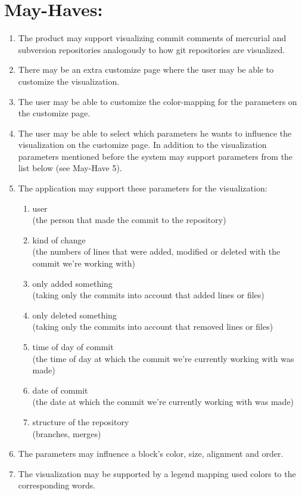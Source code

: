 \documentclass[12pt]{scrartcl}
\begin{document}
\section{May-Haves:}
\begin{enumerate}
\item The product may support visualizing commit comments of mercurial and
	subversion repositories analogously to how git repositories are
	visualized.
\item There may be an extra customize page where the user may be able to customize the visualization.
\item The user may be able to customize the color-mapping for the parameters on the customize page.
\item The user may be able to select which parameters he wants to influence the visualization on the customize page. In addition to the visualization parameters mentioned before the system may support parameters from the list below (see May-Have 5).
\item The application may support these parameters for the visualization:
\begin{enumerate}
\item user\\
(the person that made the commit to the repository)
\item kind of change\\  
(the numbers of lines that were added, modified or deleted with the commit we're working with)
\item only added something \\
(taking only the commits into account that added lines or files)
\item only deleted something\\
(taking only the commits into account that removed lines or files)
\item time of day of commit\\
(the time of day at which the commit we're currently working with was made)
\item date of commit\\
(the date at which the commit we're currently working with was made)
\item structure of the repository\\
(branches, merges)
\end{enumerate}
\item The parameters may influence a block's color, size, alignment and order.
\item The visualization may be supported by a legend mapping used colors to the corresponding words.

\end{enumerate}
\end{document}

